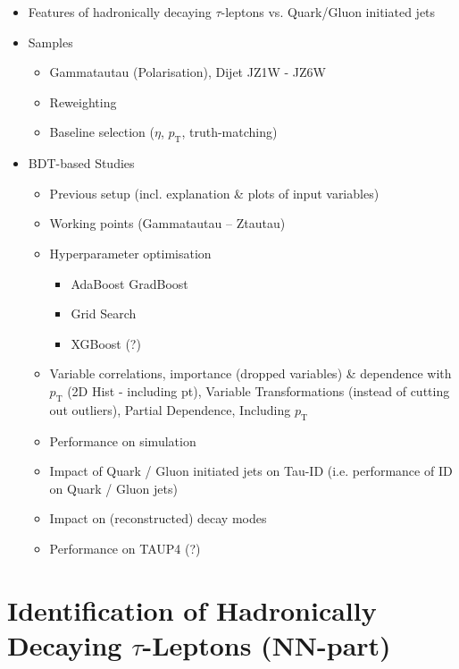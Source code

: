 \begin{itemize}
\item Features of hadronically decaying $\tau$-leptons vs. Quark/Gluon
  initiated jets

\item Samples
  \begin{itemize}
  \item Gammatautau (Polarisation), Dijet JZ1W - JZ6W
  \item Reweighting
  \item Baseline selection ($\eta$, $p_\mathrm{T}$, truth-matching)
  \end{itemize}

\item BDT-based Studies
  \begin{itemize}
  \item Previous setup (incl. explanation \& plots of input variables)
  \item Working points (Gammatautau -- Ztautau)
  \item Hyperparameter optimisation
    \begin{itemize}
    \item AdaBoost \textrightarrow GradBoost
    \item Grid Search
    \item XGBoost (?)
    \end{itemize}
  \item Variable correlations, importance (dropped variables) \& dependence with
    $p_\mathrm{T}$ (2D Hist - including pt), Variable Transformations (instead
    of cutting out outliers), Partial Dependence, Including $p_\mathrm{T}$
  \item Performance on simulation
  \item Impact of Quark / Gluon initiated jets on Tau-ID (i.e. performance of ID
    on Quark / Gluon jets)
  \item Impact on (reconstructed) decay modes
  \item Performance on TAUP4 (?)
  \end{itemize}
\end{itemize}

\section{Identification of Hadronically Decaying $\tau$-Leptons (NN-part)}


